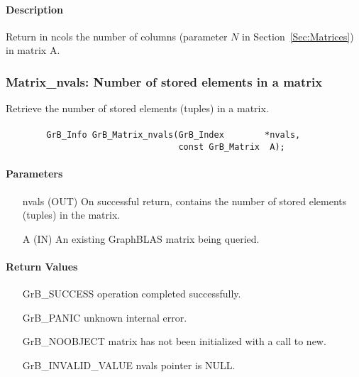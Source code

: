 \paragraph{Description}

Return in {\sf ncols} the number of columns (parameter $N$ in Section~\ref{Sec:Matrices}) in matrix {\sf A}.

\subsubsection{{\sf Matrix\_nvals}: Number of stored elements in a matrix}

Retrieve the number of stored elements (tuples) in a matrix.

\paragraph{\syntax}

\begin{verbatim}
        GrB_Info GrB_Matrix_nvals(GrB_Index        *nvals,
                                  const GrB_Matrix  A);
\end{verbatim}

\paragraph{Parameters}

\begin{itemize}[leftmargin=1.1in]
    \item[{\sf nvals}] ({\sf OUT}) On successful return, contains the number of 
    stored elements (tuples) in the matrix.
    \item[{\sf A}] ({\sf IN}) An existing GraphBLAS matrix being queried.
\end{itemize}

\paragraph{Return Values}

\begin{itemize}[leftmargin=2.1in]
\item[{\sf GrB\_SUCCESS}]   operation completed successfully.
\item[{\sf GrB\_PANIC}]     unknown internal error.
\item[{\sf GrB\_NOOBJECT}]  matrix has not been initialized with a call to {\sf new}.
\item[{\sf GrB\_INVALID\_VALUE}]    {\sf nvals} pointer is {\sf NULL}.
\end{itemize}

